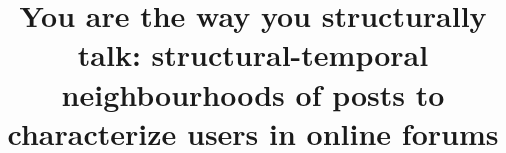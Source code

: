 \documentclass[conference]{IEEEtran}
\begin{document}
%
\title{You are the way you structurally talk: structural-temporal neighbourhoods of posts to characterize users in online forums}




\end{document}
